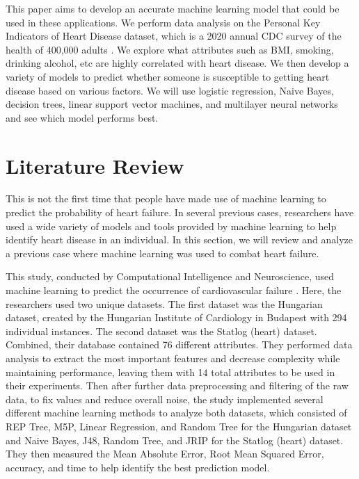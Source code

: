\documentclass[a4paper]{article}
\begin{document}
This paper aims to develop an accurate machine learning model that could be used in these applications. We perform data analysis on the Personal Key Indicators of Heart Disease dataset, which is a 2020 annual CDC survey of the health of 400,000 adults \cite{dataset}. We explore what attributes such as BMI, smoking, drinking alcohol, etc are highly correlated with heart disease. We then develop a variety of models to predict whether someone is susceptible to getting heart disease based on various factors. We will use logistic regression, Naive Bayes, decision trees, linear support vector machines, and multilayer neural networks and see which model performs best. 


\section{Literature Review}

This is not the first time that people have made use of machine learning to predict the probability of heart failure. In several previous cases, researchers have used a wide variety of models and tools provided by machine learning to help identify heart disease in an individual. In this section, we will review and analyze a previous case where machine learning was used to combat heart failure.

This study, conducted by Computational Intelligence and Neuroscience, used machine learning to predict the occurrence of cardiovascular failure \cite{review}. Here, the researchers used two unique datasets. The first dataset was the Hungarian dataset, created by the Hungarian Institute of Cardiology in Budapest with 294 individual instances. The second dataset was the Statlog (heart) dataset. Combined, their database contained 76 different attributes. They performed data analysis to extract the most important features and decrease complexity while maintaining performance, leaving them with 14 total attributes to be used in their experiments. Then after further data preprocessing and filtering of the raw data, to fix values and reduce overall noise, the study implemented several different machine learning methods to analyze both datasets, which consisted of REP Tree, M5P, Linear Regression, and Random Tree for the Hungarian dataset and Naive Bayes, J48, Random Tree, and JRIP for the Statlog (heart) dataset. They then measured the Mean Absolute Error, Root Mean Squared Error, accuracy, and time to help identify the best prediction model. 
\end{document}
